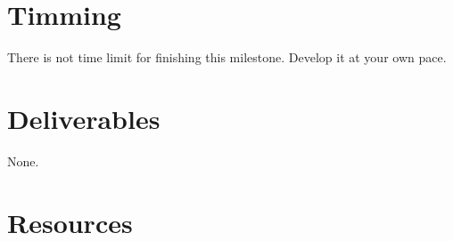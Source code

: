 \section{Timming}

There is not time limit for finishing this milestone. Develop it at
your own pace.

\section{Deliverables}

None.

\section{Resources}


